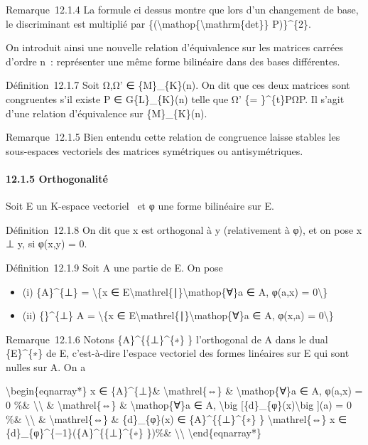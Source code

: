 \documentclass[]{article}
\begin{document}
Remarque~12.1.4 La formule ci dessus montre que lors d'un changement de
base, le discriminant est multiplié par
\{(\textbackslash{}mathop\{\textbackslash{}mathrm\{det\}\}
P)\}\^{}\{2\}.

On introduit ainsi une nouvelle relation d'équivalence sur les matrices
carrées d'ordre n~: représenter une même forme bilinéaire dans des bases
différentes.

Définition~12.1.7 Soit Ω,Ω' ∈ \{M\}\_\{K\}(n). On dit que ces deux
matrices sont congruentes s'il existe P ∈ G\{L\}\_\{K\}(n) telle que Ω'
\{= \}\^{}\{t\}PΩP. Il s'agit d'une relation d'équivalence sur
\{M\}\_\{K\}(n).

Remarque~12.1.5 Bien entendu cette relation de congruence laisse stables
les sous-espaces vectoriels des matrices symétriques ou antisymétriques.

\paragraph{12.1.5 Orthogonalité}

Soit E un K-espace vectoriel ~et φ une forme bilinéaire sur E.

Définition~12.1.8 On dit que x est orthogonal à y (relativement à φ), et
on pose x ⊥ y, si φ(x,y) = 0.

Définition~12.1.9 Soit A une partie de E. On pose

\begin{itemize}
\itemsep1pt\parskip0pt
\item
  (i) \{A\}\^{}\{⊥\} = \textbackslash{}\{x ∈
  E\textbackslash{}mathrel\{∣\}\textbackslash{}mathop\{∀\}a ∈ A, φ(a,x)
  = 0\textbackslash{}\}
\item
  (ii) \{\}\^{}\{⊥\} A = \textbackslash{}\{x ∈
  E\textbackslash{}mathrel\{∣\}\textbackslash{}mathop\{∀\}a ∈ A, φ(x,a)
  = 0\textbackslash{}\}
\end{itemize}

Remarque~12.1.6 Notons \{A\}\^{}\{\{⊥\}\^{}\{∗\} \} l'orthogonal de A
dans le dual \{E\}\^{}\{∗\} de E, c'est-à-dire l'espace vectoriel des
formes linéaires sur E qui sont nulles sur A. On a

\textbackslash{}begin\{eqnarray*\} x ∈ \{A\}\^{}\{⊥\}\&
\textbackslash{}mathrel\{⇔\} \& \textbackslash{}mathop\{∀\}a ∈ A, φ(a,x)
= 0 \%\& \textbackslash{}\textbackslash{} \&
\textbackslash{}mathrel\{⇔\} \& \textbackslash{}mathop\{∀\}a ∈ A,
\textbackslash{}big {[}\{d\}\_\{φ\}(x)\textbackslash{}big {]}(a) = 0
\%\& \textbackslash{}\textbackslash{} \& \textbackslash{}mathrel\{⇔\} \&
\{d\}\_\{φ\}(x) ∈ \{A\}\^{}\{\{⊥\}\^{}\{∗\} \}
\textbackslash{}mathrel\{⇔\} x ∈
\{d\}\_\{φ\}\^{}\{−1\}(\{A\}\^{}\{\{⊥\}\^{}\{∗\} \})\%\&
\textbackslash{}\textbackslash{} \textbackslash{}end\{eqnarray*\}
\end{document}
